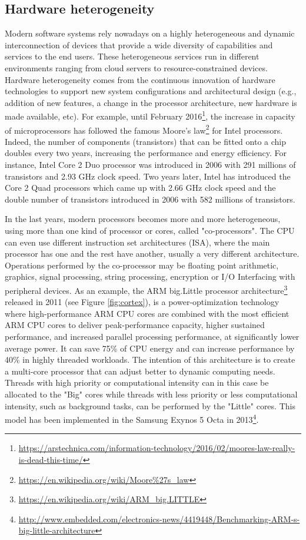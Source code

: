 \subsection{Hardware heterogeneity}
Modern software systems rely nowadays on a highly heterogeneous and dynamic interconnection of devices that provide a wide diversity of capabilities and services to the end users.
These heterogeneous services run in different environments ranging from cloud servers to resource-constrained devices.
Hardware heterogeneity comes from the continuous innovation of hardware technologies to support new system configurations and architectural design (e.g., addition of new features, a change in the processor architecture, new hardware is made available, etc). 
For example, until February 2016\footnote{\url{https://arstechnica.com/information-technology/2016/02/moores-law-really-is-dead-this-time/}}, the increase in capacity of microprocessors has followed the famous Moore's law\footnote{\url{https://en.wikipedia.org/wiki/Moore\%27s_law}} for Intel processors. Indeed, the number of components (transistors) that can be fitted onto a chip doubles every two years, increasing the performance and energy efficiency.
For instance, Intel Core 2 Duo processor was introduced in 2006 with 291 millions of transistors and 2.93 GHz clock speed. Two years later, Intel has introduced the Core 2 Quad processors which came up with 2.66 GHz clock speed and the double number of transistors introduced in 2006 with 582 millions of transistors.

In the last years, modern processors becomes more and more heterogeneous, using more than one kind of processor or cores, called "co-processors". The CPU can even use different instruction set architectures (ISA), where the main processor has one and the rest have another, usually a very different architecture. Operations performed by the co-processor may be floating point arithmetic, graphics, signal processing, string processing, encryption or I/O Interfacing with peripheral devices. 
As an example, the ARM big.Little processor architecture\footnote{\url{https://en.wikipedia.org/wiki/ARM_big.LITTLE}} released in 2011 (see Figure \ref{fig:cortex}), is a power-optimization technology where high-performance ARM CPU cores are combined with the most efficient ARM CPU cores to deliver peak-performance capacity, higher sustained performance, and increased parallel processing performance, at significantly lower average power. It can save 75\% of CPU energy and can increase performance by 40\% in highly threaded workloads.
The intention of this architecture is to create a multi-core processor that can adjust better to dynamic computing needs.
Threads with high priority or computational intensity can in this case be allocated to the "Big" cores while threads with less priority or less computational intensity, such as background tasks, can be performed by the "Little" cores. This model has been implemented in the Samsung Exynos 5 Octa in 2013\footnote{\url{http://www.embedded.com/electronics-news/4419448/Benchmarking-ARM-s-big-little-architecture}}.



